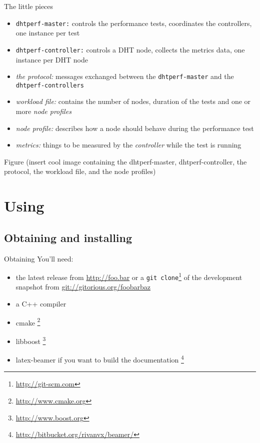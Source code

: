 \documentclass[compress]{beamer}
\begin{document}
\begin{frame}{The little pieces}
\begin{itemize}
    \item \texttt{dhtperf-master:} controls the performance tests, coordinates
    the controllers, one instance per test
    \item \texttt{dhtperf-controller:} controls a DHT node, collects the metrics
    data, one instance per DHT node
    \item \emph{the protocol:} messages exchanged between the
    \texttt{dhtperf-master} and the \texttt{dhtperf-controllers}
    \item \emph{workload file:} contains the number of nodes, duration of the
    tests and one or more \emph{node profiles}
    \item \emph{node profile:} describes how a node should behave during the
    performance test
    \item \emph{metrics:} things to be measured by the \emph{controller} while
    the test is running
\end{itemize}
\end{frame}

\begin{frame}{Figure}
(insert cool image containing the dhtperf-master, dhtperf-controller, the
protocol, the workload file, and the node profiles)
\end{frame}

\section{Using}

\subsection{Obtaining and installing}
\begin{frame}{Obtaining}
You'll need:
\begin{itemize}
    \item the latest release from \url{http://foo.bar} or a \texttt{git
    clone}\footnote{\url{http://git-scm.com}}
    of the development snapshot from \url{git://gitorious.org/foobarbaz}
    \item a C++ compiler
    \item cmake \footnote{\url{http://www.cmake.org}}
    \item libboost \footnote{\url{http://www.boost.org}}
    \item latex-beamer if you want to build the documentation
    \footnote{\url{http://bitbucket.org/rivanvx/beamer/}}
\end{itemize}
\end{frame}
\end{document}
